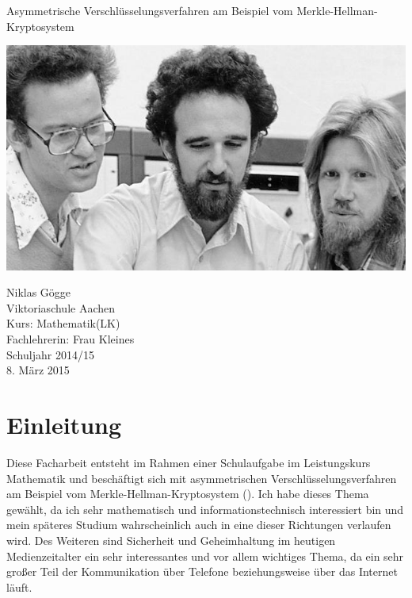 \documentclass[a4paper,12pt,titlepage]{article}
\author
{
Niklas Gögge\\
Viktoriaschule Aachen\\
Kurs: Mathematik(LK)\\
Fachlehrerin: Frau Kleines\\
Schuljahr 2014/15
}
\begin{document}
\begin{titlepage}
\begin{center}

\LARGE Asymmetrische Verschlüsselungsverfahren am Beispiel vom Merkle-Hellman-Kryptosystem

\vspace{2cm}
\includegraphics[scale=0.4,natwidth=640,natheight=360]{titlepicture.jpg} \\
\vspace{2cm}

\large
Niklas Gögge\\
Viktoriaschule Aachen\\
Kurs: Mathematik(LK)\\
Fachlehrerin: Frau Kleines\\
Schuljahr 2014/15 \\
\vspace{1cm}
8. März 2015
\end{center}
\end{titlepage}

\newpage

\tableofcontents

\newpage

\section{Einleitung}
Diese Facharbeit entsteht im Rahmen einer Schulaufgabe im Leistungskurs Mathematik und
beschäftigt sich mit asymmetrischen Verschlüsselungsverfahren am Beispiel vom
Merkle-Hellman-Kryptosystem (\cite{merklehellman_neer}). Ich habe dieses Thema
gewählt, da ich sehr mathematisch und informationstechnisch interessiert bin
und mein späteres Studium wahrscheinlich auch in eine dieser Richtungen
verlaufen wird. Des
Weiteren sind Sicherheit und Geheimhaltung im heutigen Medienzeitalter ein sehr
interessantes und vor allem wichtiges Thema, da ein sehr großer Teil der
Kommunikation über Telefone beziehungsweise über das Internet läuft.
\end{document}
